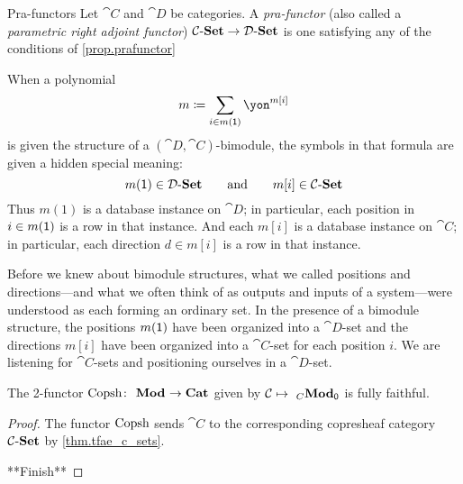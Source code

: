 \documentclass[Book-Poly]{subfiles}
\begin{document}
\begin{definition}{Pra-functors}
Let $\cat{C}$ and $\cat{D}$ be categories. A \emph{pra-functor} (also called a \emph{parametric right adjoint functor}) $\mathcal{C}\textnormal{-}\mathbf{Set}\to\mathcal{D}\textnormal{-}\mathbf{Set}$ is one satisfying any of the conditions of \cref{prop.prafunctor}
\end{definition}

When a polynomial
\[
m\coloneqq\sum_{i\in m(\1)}\yon^{m[i]}
\]
is given the structure of a $(\cat{D},\cat{C})$-bimodule, the symbols in that formula are given a hidden special meaning:
\[
  m(\textsf{1})\in\mathcal{D}\textnormal{-}\mathbf{Set}
  \qquad\text{and}\qquad
	m[i]\in\mathcal{C}\textnormal{-}\mathbf{Set}
\]
Thus $m(1)$ is a database instance on $\cat{D}$; in particular, each position in $i\in m(\textsf{1})$ is a row in that instance. And each $m[i]$ is a database instance on $\cat{C}$; in particular, each direction $d\in m[i]$ is a row in that instance.

Before we knew about bimodule structures, what we called positions and directions---and what we often think of as outputs and inputs of a system---were understood as each forming an ordinary set. In the presence of a bimodule structure, the positions $m(\textsf{1})$ have been organized into a $\cat{D}$-set and the directions $m[i]$ have been organized into a $\cat{C}$-set for each position $i$. We are listening for $\cat{C}$-sets and positioning ourselves in a $\cat{D}$-set.

\begin{theorem}
The 2-functor $\mathrm{Copsh}\colon~_{}\mathbf{Mod}_{}\to\mathbf{Cat}$ given by $\mathcal{C}\mapsto~_{C}\mathbf{Mod}_{\textsf{0}}$ is fully faithful.
\end{theorem}
\begin{proof}
The functor $\mathrm{Copsh}$ sends $\cat{C}$ to the corresponding copresheaf category $\mathcal{C}\textnormal{-}\mathbf{Set}$ by \cref{thm.tfae_c_sets}.

**Finish**
\end{proof}
\end{document}
